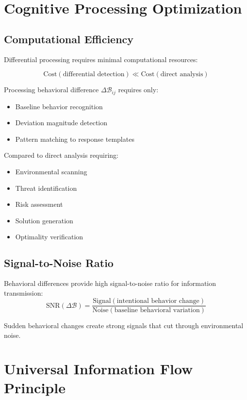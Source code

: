 \documentclass{article}
\begin{document}
\section{Cognitive Processing Optimization}

\subsection{Computational Efficiency}
Differential processing requires minimal computational resources:
\begin{proposition}
$$\text{Cost}(\text{differential detection}) \ll \text{Cost}(\text{direct analysis})$$
\end{proposition}

Processing behavioral difference $\Delta \mathcal{B}_{ij}$ requires only:
\begin{itemize}
    \item Baseline behavior recognition
    \item Deviation magnitude detection  
    \item Pattern matching to response templates
\end{itemize}

Compared to direct analysis requiring:
\begin{itemize}
    \item Environmental scanning
    \item Threat identification
    \item Risk assessment
    \item Solution generation
    \item Optimality verification
\end{itemize}

\subsection{Signal-to-Noise Ratio}
Behavioral differences provide high signal-to-noise ratio for information transmission:
$$\text{SNR}(\Delta \mathcal{B}) = \frac{\text{Signal}(\text{intentional behavior change})}{\text{Noise}(\text{baseline behavioral variation})}$$

Sudden behavioral changes create strong signals that cut through environmental noise.

\section{Universal Information Flow Principle}
\end{document}
